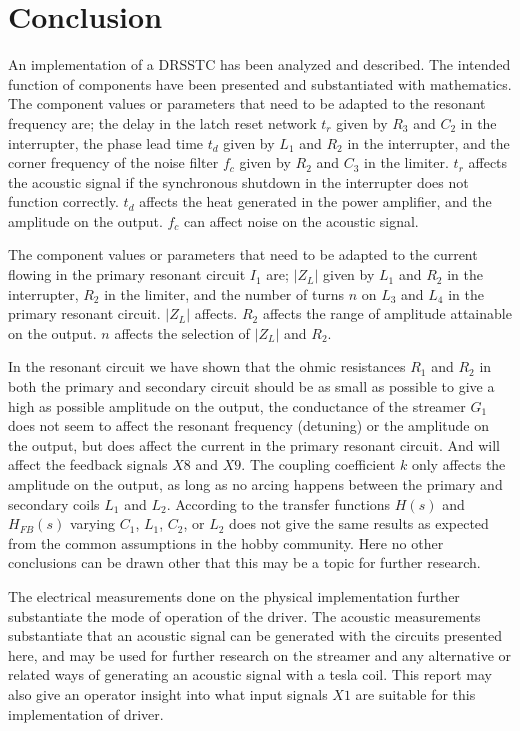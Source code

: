 \chapter{Conclusion}
An implementation of a DRSSTC has been analyzed and described. The intended function of components have been presented and substantiated with mathematics. The component values or parameters that need to be adapted to the resonant frequency are; the delay in the latch reset network $t_r$ given by $R_3$ and $C_2$ in the interrupter, the phase lead time $t_d$ given by $L_1$ and $R_2$ in the interrupter, and the corner frequency of the noise filter $f_c$ given by $R_2$ and $C_3$ in the limiter. $t_r$ affects the acoustic signal if the synchronous shutdown in the interrupter does not function correctly. $t_d$ affects the heat generated in the power amplifier, and the amplitude on the output. $f_c$ can affect noise on the acoustic signal.

The component values or parameters that need to be adapted to the current flowing in the primary resonant circuit $I_1$ are; $|Z_L|$ given by $L_1$ and $R_2$ in the interrupter, $R_2$ in the limiter, and the number of turns $n$ on $L_3$ and $L_4$ in the primary resonant circuit. $|Z_L|$ affects. $R_2$ affects the range of amplitude attainable on the output. $n$ affects the selection of $|Z_L|$ and $R_2$.

In the resonant circuit we have shown that the ohmic resistances $R_1$ and $R_2$ in both the primary and secondary circuit should be as small as possible to give a high as possible amplitude on the output, the conductance of the streamer $G_1$ does not seem to affect the resonant frequency (detuning) or the amplitude on the output, but does affect the current in the primary resonant circuit. And will affect the feedback signals $X8$ and $X9$. The coupling coefficient $k$ only affects the amplitude on the output, as long as no arcing happens between the primary and secondary coils $L_1$ and $L_2$. According to the transfer functions $H(s)$ and $H_{FB}(s)$ varying $C_1$, $L_1$, $C_2$, or $L_2$ does not give the same results as expected from the common assumptions in the hobby community. Here no other conclusions can be drawn other that this may be a topic for further research.

The electrical measurements done on the physical implementation further substantiate the mode of operation of the driver. The acoustic measurements substantiate that an acoustic signal can be generated with the circuits presented here, and may be used for further research on the streamer and any alternative or related ways of generating an acoustic signal with a tesla coil. This report may also give an operator insight into what input signals $X1$ are suitable for this implementation of driver.





